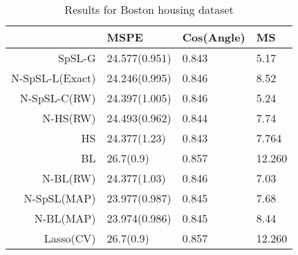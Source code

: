 \begin{table}[ht]
\centering
\begin{tabular}{rlll}
  \hline
 & MSPE & Cos(Angle) & MS \\ 
  \hline
SpSL-G & 24.577(0.951) & 0.843 & 5.17 \\ 
  N-SpSL-L(Exact) & 24.246(0.995) & 0.846 & 8.52 \\ 
  N-SpSL-C(RW) & 24.397(1.005) & 0.846 & 5.24 \\ 
  N-HS(RW) & 24.493(0.962) & 0.844 & 7.74 \\ 
  HS & 24.377(1.23) & 0.843 & 7.764\\
  BL&     26.7(0.9)&     0.857&    12.260\\
  N-BL(RW) & 24.377(1.03) & 0.846 & 7.03 \\ 
  N-SpSL(MAP) & 23.977(0.987) & 0.845 & 7.68 \\ 
  N-BL(MAP) & 23.974(0.986) & 0.845 & 8.44 \\ 
  Lasso(CV) &     26.7(0.9)&     0.857&    12.260\\
   \hline
\end{tabular}
\caption{Results for Boston housing dataset} 
\label{table:boston}
\end{table}
